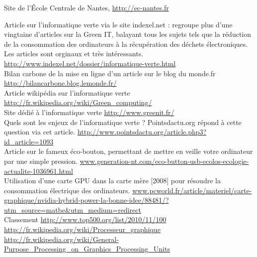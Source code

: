 \documentclass[a4paper,11pt,french]{report}
\begin{document}
\begin{thebibliography}{GreenIT}
 {Site de l'\'Ecole Centrale de Nantes, \url{http://ec-nantes.fr}\\}

 Article sur l'informatique verte via le site indexel.net : regroupe plus d'une vingtaine d'articles sur la Green IT, balayant tous les sujets tels que la réduction de la consommation des ordinateurs à la récupération des déchets électroniques. Les articles sont orginaux et très intéressants. \url{http://www.indexel.net/dossier/informatique-verte.html}\\

Bilan carbone de la mise en ligne d'un article sur le blog du monde.fr  \url{http://bilancarbone.blog.lemonde.fr/}\\

 Article wikipédia sur l'informatique verte \url{http://fr.wikipedia.org/wiki/Green_computing/}\\

 Site dédié à l'informatique verte \url{http://www.greenit.fr/}\\

 Quels sont les enjeux de l'informatique verte ? Pointsdactu.org répond à cette question via cet article. \url{http://www.pointsdactu.org/article.php3?id_article=1093}\\

 Article sur le fameux éco-bouton, permettant de mettre en veille votre ordinateur par une simple pression. \url{www.generation-nt.com/eco-button-usb-ecolos-ecologie-actualite-1036961.html}\\

 Utilisation d'une carte GPU dans la carte mère [2008] pour résoudre la consommation électrique des ordinateurs. \url{www.pcworld.fr/article/materiel/carte-graphique/nvidia-hybrid-power-la-bonne-idee/88481/?utm_source=matbe&utm_medium=redirect}\\

 Classement \url{http://www.top500.org/list/2010/11/100}\\

 \url{http://fr.wikipedia.org/wiki/Processeur_graphique}\\

 \url{http://fr.wikipedia.org/wiki/General-Purpose_Processing_on_Graphics_Processing_Units}\\


\end{thebibliography}
\end{document}
